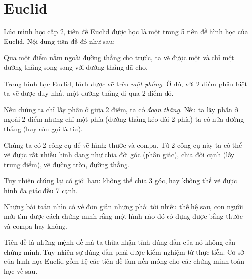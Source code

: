 \chapter{Euclid}

Lúc mình học cấp 2, tiên đề Euclid được học là một trong 5 tiên đề hình học của Euclid. Nội dung tiên đề đó như sau:

\begin{axiom}
    Qua một điểm nằm ngoài đường thẳng cho trước, ta vẽ được một và chỉ một đường thẳng song song với đường thẳng đã cho.
\end{axiom}

Trong hình học Euclid, hình được vẽ trên \textit{mặt phẳng}. Ở đó, với 2 điểm phân biệt ta vẽ được duy nhất một đường thẳng đi qua 2 điểm đó.

Nếu chúng ta chỉ lấy phần ở giữa 2 điểm, ta có \textit{đoạn thẳng}. Nếu ta lấy phần ở ngoài 2 điểm nhưng chỉ một phía (đường thẳng kéo dài 2 phía) ta có nửa đường thẳng (hay còn gọi là tia).

Chúng ta có 2 công cụ để vẽ hình: thước và compa. Từ 2 công cụ này ta có thể vẽ được rất nhiều hình dạng như chia đôi góc (phân giác), chia đôi cạnh (lấy trung điểm), vẽ đường tròn, đường thẳng.

Tuy nhiên chúng lại có giới hạn: không thể chia 3 góc, hay không thể vẽ được hình đa giác đều 7 cạnh.

Những bài toán nhìn có vẻ đơn giản nhưng phải tới nhiều thế hệ sau, con người mới tìm được cách chứng minh rằng một hình nào đó có dựng được bằng thước và compa hay không.

Tiên đề là những mệnh đề mà ta thừa nhận tính đúng đắn của nó không cần chứng minh. Tuy nhiên sự đúng đắn phải được kiểm nghiệm từ thực tiễn.
Cơ sở của hình học Euclid gồm hệ các tiên đề làm nền móng cho các chứng minh toán học về sau.